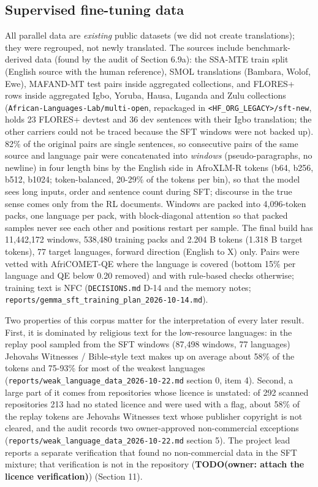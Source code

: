 \subsection{Supervised fine-tuning data}\label{supervised-fine-tuning-data}

All parallel data are \emph{existing} public datasets (we did not create translations); they were regrouped, not newly translated. The sources include benchmark-derived data (found by the audit of Section 6.9a): the SSA-MTE train split (English source with the human reference), SMOL translations (Bambara, Wolof, Ewe), MAFAND-MT test pairs inside aggregated collections, and FLORES+ rows inside aggregated Igbo, Yoruba, Hausa, Luganda and Zulu collections (\texttt{African-Languages-Lab/multi-open}, repackaged in \texttt{<HF_ORG_LEGACY>/sft-new}, holds 23 FLORES+ devtest and 36 dev sentences with their Igbo translation; the other carriers could not be traced because the SFT windows were not backed up). 82\% of the original pairs are single sentences, so consecutive pairs of the same source and language pair were concatenated into \emph{windows} (pseudo-paragraphs, no newline) in four length bins by the English side in AfroXLM-R tokens (b64, b256, b512, b1024; token-balanced, 20-29\% of the tokens per bin), so that the model sees long inputs, order and sentence count during SFT; discourse in the true sense comes only from the RL documents. Windows are packed into 4,096-token packs, one language per pack, with block-diagonal attention so that packed samples never see each other and positions restart per sample. The final build has 11,442,172 windows, 538,480 training packs and 2.204 B tokens (1.318 B target tokens), 77 target languages, forward direction (English to X) only. Pairs were vetted with AfriCOMET-QE where the language is covered (bottom 15\% per language and QE below 0.20 removed) and with rule-based checks otherwise; training text is NFC (\texttt{DECISIONS.md} D-14 and the memory notes; \texttt{reports/gemma\_sft\_training\_plan\_2026-10-14.md}).

Two properties of this corpus matter for the interpretation of every later result. First, it is dominated by religious text for the low-resource languages: in the replay pool sampled from the SFT windows (87,498 windows, 77 languages) Jehovah\textquotesingle s Witnesses / Bible-style text makes up on average about 58\% of the tokens and 75-93\% for most of the weakest languages (\texttt{reports/weak\_language\_data\_2026-10-22.md} section 0, item 4). Second, a large part of it comes from repositories whose licence is unstated: of 292 scanned repositories 213 had no stated licence and were used with a flag, about 58\% of the replay tokens are Jehovah\textquotesingle s Witnesses text whose publisher copyright is not cleared, and the audit records two owner-approved non-commercial exceptions (\texttt{reports/weak\_language\_data\_2026-10-22.md} section 5). The project lead reports a separate verification that found no non-commercial data in the SFT mixture; that verification is not in the repository ({\color{red}\textbf{TODO(owner: attach the licence verification)}}) (Section 11).

